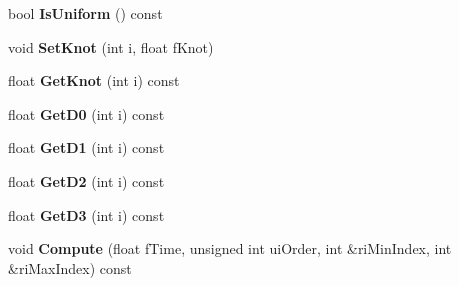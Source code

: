\begin{DoxyCompactItemize}
\item 
bool {\bfseries Is\+Uniform} () const \hypertarget{class_magnum_1_1_b_spline_basis_a0a62018cd3d814bb1e719378bbfa390c}{}\label{class_magnum_1_1_b_spline_basis_a0a62018cd3d814bb1e719378bbfa390c}

\item 
void {\bfseries Set\+Knot} (int i, float f\+Knot)\hypertarget{class_magnum_1_1_b_spline_basis_a04b68d140cef79aae88dea0c96ced74b}{}\label{class_magnum_1_1_b_spline_basis_a04b68d140cef79aae88dea0c96ced74b}

\item 
float {\bfseries Get\+Knot} (int i) const \hypertarget{class_magnum_1_1_b_spline_basis_a600766bdb2cb4b5e92c2956a0ccaa280}{}\label{class_magnum_1_1_b_spline_basis_a600766bdb2cb4b5e92c2956a0ccaa280}

\item 
float {\bfseries Get\+D0} (int i) const \hypertarget{class_magnum_1_1_b_spline_basis_a16fdf99f6e642ca4504c70a18d984abe}{}\label{class_magnum_1_1_b_spline_basis_a16fdf99f6e642ca4504c70a18d984abe}

\item 
float {\bfseries Get\+D1} (int i) const \hypertarget{class_magnum_1_1_b_spline_basis_a6e3c4f1e968b2ecf692678276473dc52}{}\label{class_magnum_1_1_b_spline_basis_a6e3c4f1e968b2ecf692678276473dc52}

\item 
float {\bfseries Get\+D2} (int i) const \hypertarget{class_magnum_1_1_b_spline_basis_a0beb422409f338ff50ed8e7ff20a8d75}{}\label{class_magnum_1_1_b_spline_basis_a0beb422409f338ff50ed8e7ff20a8d75}

\item 
float {\bfseries Get\+D3} (int i) const \hypertarget{class_magnum_1_1_b_spline_basis_a91262a767ffa9a9b8ceaf00ab3288a9e}{}\label{class_magnum_1_1_b_spline_basis_a91262a767ffa9a9b8ceaf00ab3288a9e}

\item 
void {\bfseries Compute} (float f\+Time, unsigned int ui\+Order, int \&ri\+Min\+Index, int \&ri\+Max\+Index) const \hypertarget{class_magnum_1_1_b_spline_basis_ae3661e2db185ecd0c98259f59d1d67bd}{}\label{class_magnum_1_1_b_spline_basis_ae3661e2db185ecd0c98259f59d1d67bd}

\end{DoxyCompactItemize}

